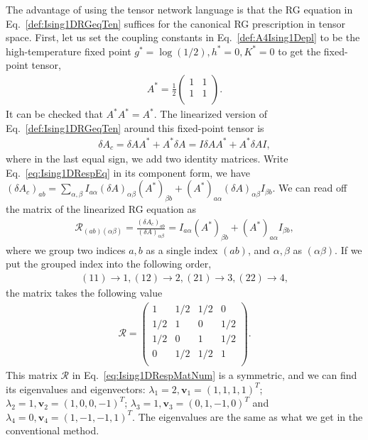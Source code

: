 \documentclass[aps,prr,reprint,superscriptaddress,nofootinbib,floatfix]{revtex4-2}
\begin{document}
The advantage of using the tensor network language is that the RG equation in Eq.~\eqref{def:Ising1DRGeqTen} suffices for the canonical RG prescription in tensor space. 
First, let us set the coupling constants in Eq.~\eqref{def:A4Ising1Depl} to be the high-temperature fixed point $g^* = \log{\left(1/2\right)}, h^*=0, K^* = 0$ to get the fixed-point tensor,
%
\begin{align}\label{eq:fixedA4Ising1D}
    A^* = \frac{1}{2}
\begin{pmatrix}
    1 & 1 \\
    1 & 1 \\
\end{pmatrix}.
\end{align}
%
It can be checked that $A^* A^* = A^*$. 
The linearized version of Eq.~\eqref{def:Ising1DRGeqTen} around this fixed-point tensor is
%
\begin{align}\label{eq:Ising1DRespEq}
    \delta A_c = \delta A A^* + A^* \delta A = I \delta A A^* + A^*
    \delta A I,
\end{align}
%
where in the last equal sign, we add two identity matrices. 
Write Eq.~\eqref{eq:Ising1DRespEq} in its component form, we have $\left(\delta A_c\right)_{ab} = \sum_{\alpha,\beta}I_{a\alpha}\left(\delta A\right)_{\alpha\beta} \left(A^*\right)_{\beta b} + \left(A^*\right)_{a\alpha} \left(\delta A\right)_{\alpha \beta} I_{\beta b}$. 
We can read off the matrix of the linearized RG equation as
%
\begin{align}\label{eq:Ising1DRespMat}
    \mathcal{R}_{(ab)(\alpha \beta)} = \frac{\left(\delta
    A_c\right)_{ab}}{\left(\delta A\right)_{\alpha \beta}} =
    I_{a\alpha}\left(A^*\right)_{\beta b} + \left(A^*\right)_{a\alpha}
    I_{\beta b},
\end{align}
%
where we group two indices $a,b$ as a single index $(ab)$, and $\alpha,\beta$ as $(\alpha\beta)$. 
If we put the grouped index into the following order,
%
\begin{align}\label{def:orderConvention}
    (11) \rightarrow 1, (12) \rightarrow 2, (21) \rightarrow 3, (22)
    \rightarrow 4,
\end{align}
%
the matrix takes the following value
%
\begin{align}\label{eq:Ising1DRespMatNum}
    \mathcal{R} = 
\begin{pmatrix}
    1 & 1/2 & 1/2 & 0 \\
    1/2 & 1 & 0 & 1/2 \\
    1/2 & 0 & 1 & 1/2 \\
    0 & 1/2 & 1/2 & 1 \\
\end{pmatrix}.
\end{align}
%
This matrix $\mathcal{R}$ in Eq.~\eqref{eq:Ising1DRespMatNum} is a symmetric, and we can find its eigenvalues and eigenvectors: $\lambda_1 = 2,\mathbf{v}_1 = (1,1,1,1)^T$; $\lambda_2 = 1,\mathbf{v}_2 = (1,0,0,-1)^T$; $\lambda_3 =1, \mathbf{v}_3 = (0,1,-1,0)^T$ and $\lambda_4 = 0, \mathbf{v}_4 = (1,-1,-1,1)^T$. 
The eigenvalues are the same as what we get in the conventional method. 
%
\end{document}
